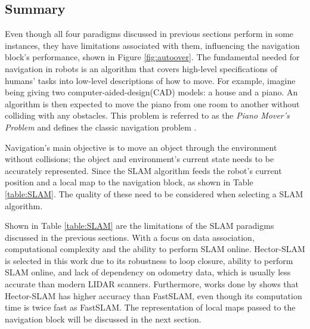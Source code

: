 \subsection{Summary}

Even though all four paradigms discussed in previous sections perform in some instances, they have limitations associated with them, influencing the navigation block's performance, shown in Figure \ref{fig:autoover}. The fundamental needed for navigation in robots is an algorithm that covers high-level specifications of humans' tasks into low-level descriptions of how to move. For example, imagine being giving two computer-aided-design(CAD) models: a house and a piano. An algorithm is then expected to move the piano from one room to another without colliding with any obstacles. This problem is referred to as the \textit{Piano Mover's Problem} and defines the classic navigation problem \cite{lavalle_2006}.

Navigation's main objective is to move an object through the environment without collisions; the object and environment's current state needs to be accurately represented. Since the SLAM algorithm feeds the robot's current position and a local map to the navigation block, as shown in Table \ref{table:SLAM}. The quality of these need to be considered when selecting a SLAM algorithm. 

Shown in Table \ref{table:SLAM} are the limitations of the SLAM paradigms discussed in the previous sections. With a focus on data association, computational complexity and the ability to perform SLAM online. Hector-SLAM is selected in this work due to its robustness to loop closure, ability to perform SLAM online, and lack of dependency on odometry data, which is usually less accurate than modern LIDAR scanners. Furthermore, works done by \cite{Eliwa2017} shows that Hector-SLAM has higher accuracy than FastSLAM, even though its computation time is twice fast as FastSLAM. The representation of local maps passed to the navigation block will be discussed in the next section.


